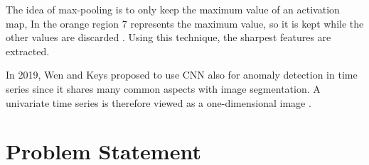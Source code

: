 The idea of max-pooling is to only keep the maximum value of an activation map, In the orange region 7 represents the maximum value, so it is kept while the other values are discarded \parencite{RichStureborg2019}. Using this technique, the sharpest features are extracted.

In 2019, Wen and Keys proposed to use CNN also for anomaly detection in time series since it shares many common aspects with image segmentation. A univariate time series is therefore viewed as a one-dimensional image \parencite{Wen2019}.\\ 





\section{Problem Statement} \label{Problem}

